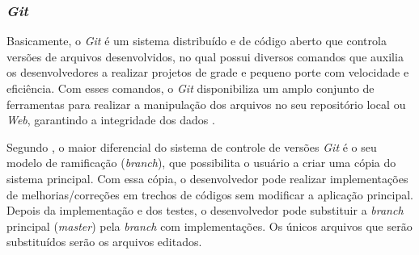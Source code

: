 \subsubsection{\textit{Git}}

Basicamente, o \textit{Git} é um sistema distribuído e de código aberto que controla versões de arquivos desenvolvidos, no qual possui diversos comandos que auxilia os desenvolvedores a realizar projetos de grade e pequeno porte com velocidade e eficiência.  Com esses comandos, o \textit{Git} disponibiliza um amplo conjunto de ferramentas para realizar a manipulação dos arquivos no seu repositório local ou \textit{Web}, garantindo a integridade dos dados \cite{GIT2010}.

Segundo , o maior diferencial do sistema de controle de versões \textit{Git} é o seu modelo de ramificação (\textit{branch}), que possibilita o usuário a criar uma cópia do sistema principal. Com essa cópia, o desenvolvedor pode realizar implementações de melhorias/correções em trechos de códigos sem modificar a aplicação principal. Depois da implementação e dos testes, o desenvolvedor pode substituir a \textit{branch} principal (\textit{master}) pela \textit{branch} com implementações. Os únicos arquivos que serão substituídos serão os arquivos editados. 